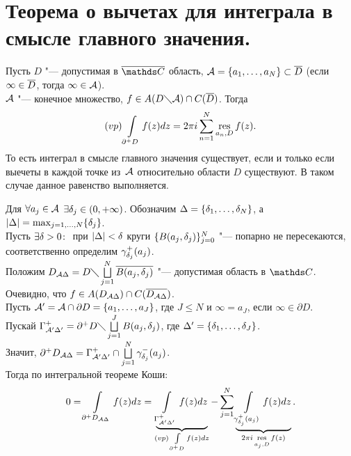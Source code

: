 \newpage
\section{Теорема о вычетах для интеграла в смысле главного значения.}
\begin{The} 
Пусть $D$ "--- допустимая в $\ol\C$ область, $\mathcal A = \{a_1,\dots,a_N\} \subset \overline{D}$ (если $\infty \in \overline{D}$, тогда $\infty \in \mathcal A$). \\
$\mathcal A$ "--- конечное множество, $f \in A(D\diagdown\mathcal A)\cap C(\overline{D})$.
Тогда
\[
(vp)\int\limits_{\partial^{+}D}f(z)dz = 2\pi i \sum\limits_{n=1}^N \mathop{\rm res}\limits\limits_{a_n , D} f(z).
\]
То есть интеграл в смысле главного значения существует, если и только если выечеты в каждой точке из~$\mathcal A$ относительно области $D$ существуют. В таком случае данное равенство выполняется.
\end{The}

\begin{Proof}
 Для $\forall a_j \in \mathcal A$  $\exists \delta_j \in (0,+\infty)$. Обозначим $\Delta = \{\delta_1,\dots,\delta_N\}$, а $|\Delta| = {\max_{j=1,\dots,N}} \{\delta_j\}$.\\
 Пусть $\exists \delta > 0 \colon$  при $|\Delta| < \delta$ круги $\{B(a_j,\delta_j)\}_{j=0}^N$ "--- попарно не пересекаются, соответственно определим $\gamma_{\delta_j}^{+}(a_j)$.\\ 
 Положим $D_{\mathcal A\Delta} = D\diagdown \bigsqcup\limits_{j=1}^N \overline{B(a_j,\delta_j)}$ "--- допустимая область в $\C$. \\
 Очевидно, что $f \in A(D_{\mathcal A\Delta}) \cap C(\overline{D_{\mathcal A\Delta}})$.\\
 Пусть $\mathcal A' = \mathcal A \cap \partial D = \{a_1,\dots,a_J\}$, где $J \le N$ и $\infty = a_J$, если $\infty \in \partial D$.\\
 Пускай $\Gamma^{+}_{\mathcal A'\Delta'} = \partial^{+} D\diagdown \bigsqcup\limits_{j=1}^J {B(a_j,\delta_j)}$, где $\Delta' = \{\delta_1,\dots,\delta_J\}$.\\
 Значит, $\partial^{+} D_{\mathcal A\Delta} = \Gamma^{+}_{\mathcal A'\Delta'} \cap \bigsqcup\limits_{j=1}^N \gamma_{\delta_j}^{-}(a_j)$.\\
 Тогда по интегральной теореме Коши:
 \[
0 = \int\limits_{\partial^{+} D_{\mathcal A\Delta}} f(z)dz =\underbrace{\int\limits_{\Gamma^{+}_{\mathcal A'\Delta'}} f(z)dz}_{(vp)\int\limits_{\partial^{+} D} f(z)dz} - \sum\limits_{j=1}^{N} \underbrace{\int\limits_{\gamma_{\delta_j}^{+}(a_j)} f(z)dz}_{2\pi i\mathop{\rm res}\limits\limits_{a_j,D} f(z) }.
 \]
\end{Proof}